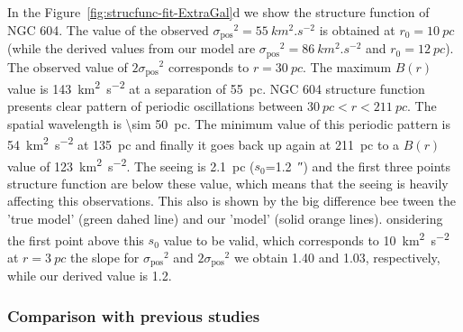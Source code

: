 \documentclass[fleqn,usenatbib, useAMS, a4paper]{mnras}
\newcommand\pos{\ensuremath{_{\mathrm{pos}}}}
\begin{document}
In the Figure~\ref{fig:strucfunc-fit-ExtraGal}d we show the structure function of NGC 604.
The value of the observed \(\sigma\pos^2 = \SI{55}{km^{2}.s^{-2}}\) is obtained at \(r_0 = \SI{10}{pc} \) (while the derived values from our model are \(\sigma\pos^2 = \SI{86}{km^{2}.s^{-2}}\) and \(r_0 = \SI{12}{pc} \)).
The observed value of \(2\sigma\pos^2\) corresponds to \(r = \SI{30}{pc} \).
The maximum \(B(r)\) value is \SI{143}{km^{2}.s^{-2}} at a separation of \SI{55}{pc}. 
NGC 604 structure function presents clear pattern of periodic oscillations between  \(\SI{30}{pc} < r < \SI{211}{pc} \).
The spatial wavelength is \SI{ \sim 50}{pc}. 
The minimum value of this periodic pattern is \SI{54}{km^{2}.s^{-2}} at \SI{135}{pc} 
and finally it goes back up again at \SI{211}{pc} to a \(B(r)\) value of \SI{123}{km^{2}.s^{-2}}.
The seeing is \SI{2.1}{pc} (\(s_0\)=\SI{1.2}{\arcsecond}) and the first three points structure function are below these value, which means that the seeing is heavily affecting this observations.
This also is shown by the big difference bee tween the 'true model' (green dahed line) and our 'model' (solid orange lines).
onsidering the first point above this \(s_0\) value to be valid, which corresponds to \SI{10}{km^{2}.s^{-2}} at \(r = \SI{3}{pc} \) the slope for \(\sigma\pos^2\) and \(2\sigma\pos^2\) we obtain \num{1.40} and \num{1.03}, respectively, while our derived value is \num{1.2}.

\subsubsection{Comparison with previous studies}
\label{sec:comparison-m33}
\end{document}
